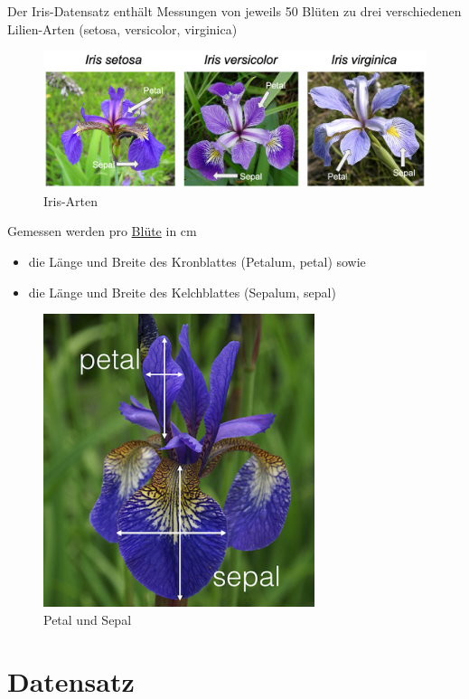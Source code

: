 \documentclass[
  oneside]{book}
\providecommand{\tightlist}{%
  \setlength{\itemsep}{0pt}\setlength{\parskip}{0pt}}
\theoremstyle{definition}
\theoremstyle{definition}
\theoremstyle{definition}
\theoremstyle{definition}
\theoremstyle{remark}
\begin{document}
Der Iris-Datensatz enthält Messungen von jeweils 50 Blüten zu drei verschiedenen Lilien-Arten (setosa, versicolor, virginica)

\begin{figure}
\centering
\includegraphics[width=1\textwidth,height=\textheight]{assets/Download.png}
\caption[Iris-Arten]{Iris-Arten\footnotemark{}}
\end{figure}

Gemessen werden pro \href{https://de.wikipedia.org/wiki/Bl\%C3\%BCte}{Blüte} in cm 

\begin{itemize}
\tightlist
\item
  die Länge und Breite des Kronblattes (Petalum, petal) sowie 
\item
  die Länge und Breite des Kelchblattes (Sepalum, sepal)
\end{itemize}

\begin{figure}
\centering
\includegraphics{assets/image_messung.png}
\caption[Petal und Sepal]{Petal und Sepal\footnotemark{}}
\end{figure}

\hypertarget{datensatz-2}{%
\section{Datensatz}\label{datensatz-2}}
\end{document}
